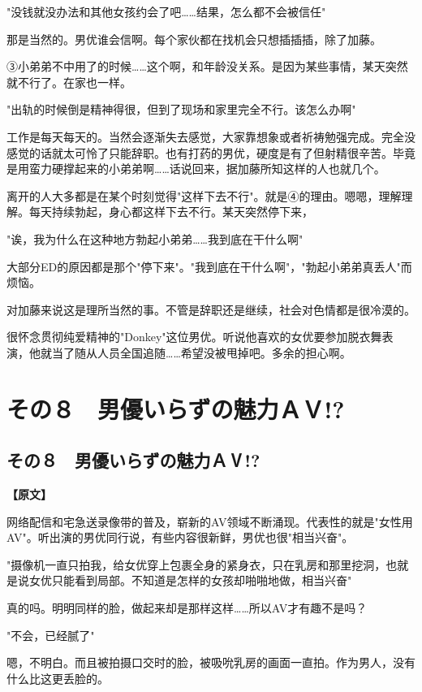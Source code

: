 \documentclass[12pt,UTF8]{ctexbook}
\begin{document}
{{"没钱就没办法和其他女孩约会了吧……结果，怎么都不会被信任"

那是当然的。男优谁会信啊。每个家伙都在找机会只想插插插，除了加藤。

③小弟弟不中用了的时候……这个啊，和年龄没关系。是因为某些事情，某天突然就不行了。在家也一样。

"出轨的时候倒是精神得很，但到了现场和家里完全不行。该怎么办啊"

工作是每天每天的。当然会逐渐失去感觉，大家靠想象或者祈祷勉强完成。完全没感觉的话就太可怜了只能辞职。也有打药的男优，硬度是有了但射精很辛苦。毕竟是用蛮力硬撑起来的小弟弟啊……话说回来，据加藤所知这样的人也就几个。

离开的人大多都是在某个时刻觉得"这样下去不行"。就是④的理由。嗯嗯，理解理解。每天持续勃起，身心都这样下去不行。某天突然停下来，

"诶，我为什么在这种地方勃起小弟弟……我到底在干什么啊"

大部分ED的原因都是那个"停下来"。"我到底在干什么啊"，"勃起小弟弟真丢人"而烦恼。

对加藤来说这是理所当然的事。不管是辞职还是继续，社会对色情都是很冷漠的。

很怀念贯彻纯爱精神的"Donkey"这位男优。听说他喜欢的女优要参加脱衣舞表演，他就当了随从人员全国追随……希望没被甩掉吧。多余的担心啊。
}

\chapter{その８　男優いらずの魅力ＡＶ!?}
\label{chap:08}
\section{その８　男優いらずの魅力ＡⅤ!?}

\vspace{1ex}
\parbox{0.9\linewidth}{
\textbf{【原文】}\par

网络配信和宅急送录像带的普及，崭新的AV领域不断涌现。代表性的就是"女性用AV"。听出演的男优同行说，有些内容很新鲜，男优也很"相当兴奋"。

"摄像机一直只拍我，给女优穿上包裹全身的紧身衣，只在乳房和那里挖洞，也就是说女优只能看到局部。不知道是怎样的女孩却啪啪地做，相当兴奋"

真的吗。明明同样的脸，做起来却是那样这样……所以AV才有趣不是吗？

"不会，已经腻了"

嗯，不明白。而且被拍摄口交时的脸，被吸吮乳房的画面一直拍。作为男人，没有什么比这更丢脸的。

}}
\end{document}
